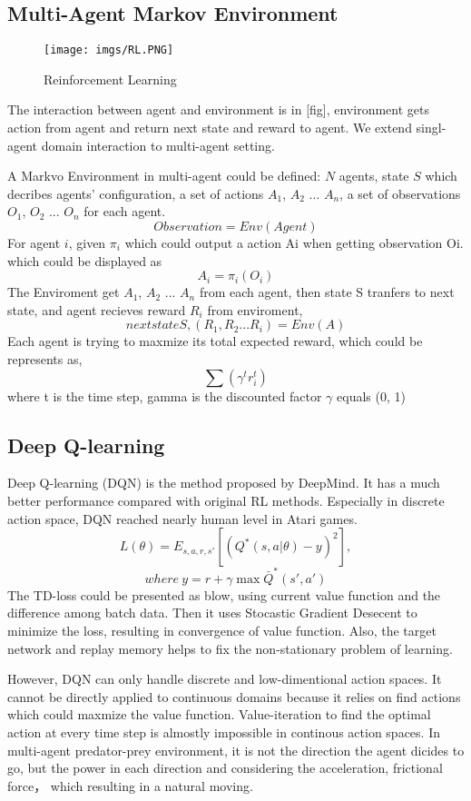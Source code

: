 \documentclass[11pt,twocolumn]{jarticle} %
\begin{document}
\subsection{Multi-Agent Markov Environment}

\begin{figure}[h]
 \begin{center}
  \texttt{[image: imgs/RL.PNG]}
  \caption{Reinforcement Learning}
  \label{fig:rl}
 \end{center}
\end{figure}

The interaction between agent and environment is in [fig], environment gets action from agent and return next state and reward to agent.
We extend singl-agent domain interaction to multi-agent setting. \par
A Markvo Environment in multi-agent could be defined: $N$ agents, 
state $S$ which decribes agents' configuration, 
a set of actions $A_1$, $A_2$ ... $A_n$,
a set of observations $O_1$, $O_2$ ... $O_n$ for each agent.
\[ Observation = Env (Agent) \]
For agent $i$, given $\pi_i$ which could output a action Ai when getting observation Oi. which could be displayed as 
\[ A_i = \pi_i (O_i) \]
The Enviroment get $A_1$, $A_2$ ... $A_n$ from each agent, 
then state S tranfers to next state, and agent recieves reward $R_i$ from enviroment,
\[ next state S, (R_1, R_2 ... R_i) = Env (A) \]
Each agent is trying to maxmize its total expected reward, which could be represents as,
\[ \sum (\gamma^t r_i^t) \]
where t is the time step, gamma is the discounted factor $\gamma$ equals (0, 1)

\subsection{Deep Q-learning}
Deep Q-learning (DQN) \cite{10} is the method proposed by DeepMind. It has a much better performance compared with original RL methods. Especially in discrete action space, DQN reached nearly human level in Atari games.
\begin{equation}
L(\theta) = E_{s,a,r,s'}[(Q^*(s, a|\theta) - y)^2],  
\end{equation}
$$where\ y = r + \gamma\max \bar{Q}^*(s', a')$$
The TD-loss could be presented as blow, using current value function and the difference among batch data. Then it uses Stocastic Gradient Desecent to minimize the loss, resulting in convergence of value function. Also, the target network and replay memory helps to fix the non-stationary problem of learning. \par
However, DQN can only handle discrete and low-dimentional action spaces. It cannot be directly applied to continuous domains because it relies on find actions which could maxmize the value function. Value-iteration to find the optimal action at every time step is almostly impossible in continous action spaces. In multi-agent predator-prey environment, it is not the direction the agent dicides to go, but the power in each direction and considering the acceleration, frictional force， which resulting in a natural moving.
\end{document}
